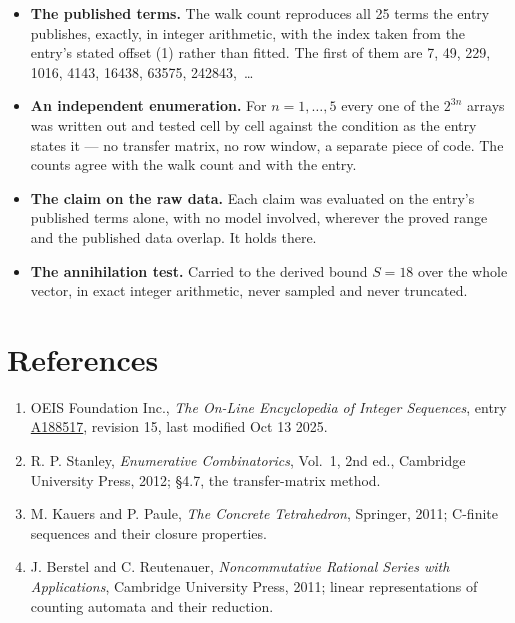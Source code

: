 \documentclass[11pt]{article}
\theoremstyle{definition}
\begin{document}
\begin{itemize}

\item {\bfseries The published terms.} The walk count reproduces all 25 terms the entry publishes, exactly, in integer arithmetic, with the index taken from the entry's stated offset (1) rather than fitted. The first of them are 7, 49, 229, 1016, 4143, 16438, 63575, 242843,~\dots

\item {\bfseries An independent enumeration.} For $n = 1,\dots,5$ every one of the $2^{3n}$ arrays was written out and tested cell by cell against the condition as the entry states it --- no transfer matrix, no row window, a separate piece of code. The counts agree with the walk count and with the entry.

\item {\bfseries The claim on the raw data.} Each claim was evaluated on the entry's published terms alone, with no model involved, wherever the proved range and the published data overlap. It holds there.

\item {\bfseries The annihilation test.} Carried to the derived bound $S = 18$ over the whole vector, in exact integer arithmetic, never sampled and never truncated.

\end{itemize}

\section{References}

\begin{enumerate}

\item OEIS Foundation Inc., \emph{The On-Line Encyclopedia of Integer Sequences}, entry \href{https://oeis.org/A188517}{A188517}, revision 15, last modified Oct 13 2025.

\item R. P. Stanley, \emph{Enumerative Combinatorics}, Vol.~1, 2nd ed., Cambridge University Press, 2012; \S4.7, the transfer-matrix method.

\item M. Kauers and P. Paule, \emph{The Concrete Tetrahedron}, Springer, 2011; C-finite sequences and their closure properties.

\item J. Berstel and C. Reutenauer, \emph{Noncommutative Rational Series with Applications}, Cambridge University Press, 2011; linear representations of counting automata and their reduction.

\end{enumerate}
\end{document}
